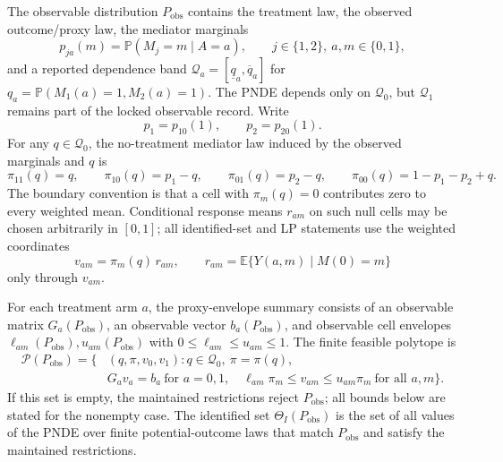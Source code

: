 \documentclass[11pt]{article}
\newcommand{\E}{\mathbb{E}}
\renewcommand{\Pr}{\mathbb{P}}
\theoremstyle{definition}
\theoremstyle{plain}
\theoremstyle{remark}
\begin{document}
The observable distribution \(P_{\mathrm{obs}}\) contains the treatment law,
the observed outcome/proxy law, the mediator marginals
\[
  p_{ja}(m)=\Pr(M_j=m\mid A=a),\qquad j\in\{1,2\},\ a,m\in\{0,1\},
\]
and a reported dependence band
\(\mathcal Q_a=[\underline q_a,\overline q_a]\) for
\(q_a=\Pr(M_1(a)=1,M_2(a)=1)\).  The PNDE depends only on
\(\mathcal Q_0\), but \(\mathcal Q_1\) remains part of the locked observable
record.  Write
\[
  p_1=p_{10}(1),\qquad p_2=p_{20}(1).
\]
For any \(q\in\mathcal Q_0\), the no-treatment mediator law induced by the
observed marginals and \(q\) is
\[
  \pi_{11}(q)=q,\qquad
  \pi_{10}(q)=p_1-q,\qquad
  \pi_{01}(q)=p_2-q,\qquad
  \pi_{00}(q)=1-p_1-p_2+q.
\]
The boundary convention is that a cell with \(\pi_m(q)=0\) contributes zero
to every weighted mean.  Conditional response means \(r_{am}\) on such null
cells may be chosen arbitrarily in \([0,1]\); all identified-set and LP
statements use the weighted coordinates
\[
  v_{am}=\pi_m(q)\,r_{am},\qquad
  r_{am}=\E\{Y(a,m)\mid M(0)=m\}
\]
only through \(v_{am}\).

For each treatment arm \(a\), the proxy-envelope summary consists of an
observable matrix \(G_a(P_{\mathrm{obs}})\), an observable vector
\(b_a(P_{\mathrm{obs}})\), and observable cell envelopes
\(\ell_{am}(P_{\mathrm{obs}}),u_{am}(P_{\mathrm{obs}})\) with
\(0\le \ell_{am}\le u_{am}\le1\).  The finite feasible polytope is
\[
\begin{aligned}
  \mathcal P(P_{\mathrm{obs}})
  =\{&(q,\pi,v_0,v_1):
      q\in\mathcal Q_0,\ 
      \pi=\pi(q),\\
    & G_a v_a=b_a\ \text{for }a=0,1,\quad
      \ell_{am}\pi_m\le v_{am}\le u_{am}\pi_m
      \ \text{for all }a,m\}.
\end{aligned}
\]
If this set is empty, the maintained restrictions reject
\(P_{\mathrm{obs}}\); all bounds below are stated for the nonempty case.  The
identified set \(\Theta_I(P_{\mathrm{obs}})\) is the set of all values of the
PNDE over finite potential-outcome laws that match \(P_{\mathrm{obs}}\) and
satisfy the maintained restrictions.
\end{document}
